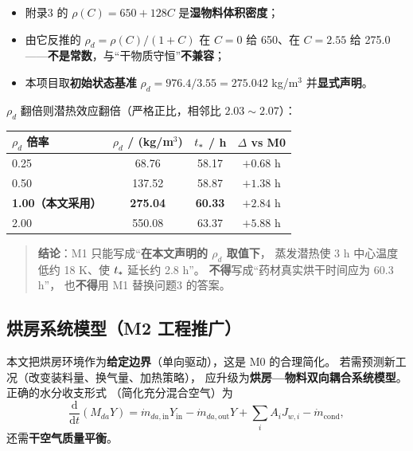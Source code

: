 \begin{itemize}[leftmargin=1.6em, itemsep=2pt]
  \item 附录3 的 $\rho(C)=650+128C$ 是\textbf{湿物料体积密度}；
  \item 由它反推的 $\rho_d=\rho(C)/(1+C)$ 在 $C=0$ 给 650、在 $C=2.55$ 给 275.0
        ——\textbf{不是常数}，与``干物质守恒''\textbf{不兼容}；
  \item 本项目取\textbf{初始状态基准} $\rho_d=976.4/3.55=275.042$ kg/m$^3$
        并\textbf{显式声明}。
\end{itemize}

$\rho_d$ 翻倍则潜热效应翻倍（严格正比，相邻比 $2.03\sim2.07$）：

\begin{table}[H]
  \centering
  \footnotesize
  \begin{tabular}{@{}lccc@{}}
    \toprule
    $\rho_d$ 倍率 & $\rho_d$ / (kg/m$^3$) & $t_{*}$ / h & $\Delta$ vs M0 \\
    \midrule
    0.25 & 68.76 & 58.17 & $+0.68$ h \\
    0.50 & 137.52 & 58.87 & $+1.38$ h \\
    \textbf{1.00（本文采用）} & \textbf{275.04} & \textbf{60.33} & $\mathbf{+2.84}$ h \\
    2.00 & 550.08 & 63.37 & $+5.88$ h \\
    \bottomrule
  \end{tabular}
\end{table}

\begin{quote}
  \textbf{结论}：M1 只能写成``\textbf{在本文声明的 $\rho_d$ 取值下}，
  蒸发潜热使 3 h 中心温度低约 18 K、使 $t_{*}$ 延长约 2.8 h''。
  \textbf{不得}写成``药材真实烘干时间应为 60.3 h''，
  也\textbf{不得}用 M1 替换问题3 的答案。
\end{quote}

\subsection{烘房系统模型（M2 工程推广）}

本文把烘房环境作为\textbf{给定边界}（单向驱动），这是 M0 的合理简化。
若需预测新工况（改变装料量、换气量、加热策略），
应升级为\textbf{烘房—物料双向耦合系统模型}。正确的水分收支形式
（简化充分混合空气）为
\begin{equation}
  \frac{\mathrm d}{\mathrm dt}\left(M_{da}Y\right)
  =\dot m_{da,\mathrm{in}}Y_{\mathrm{in}}
   -\dot m_{da,\mathrm{out}}Y+\sum_i A_i J_{w,i}-\dot m_{\mathrm{cond}},
\end{equation}
还需\textbf{干空气质量平衡}。

